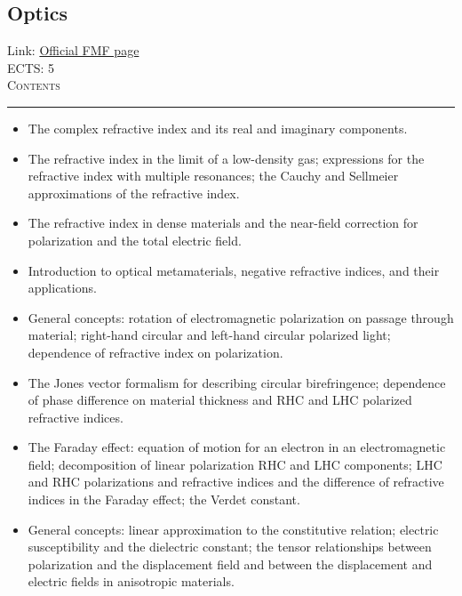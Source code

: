\documentclass[11pt, a4paper]{article}
\newenvironment{course}[3]{
\subsection{#1}%
Link: \href{#2}{Official FMF page}\\%
ECTS: #3%
\vspace{1ex}
\\
{\large \textsc{Contents}}\\[-0.9ex]%
\rule{\textwidth}{0.5pt}
\vspace{-3ex}
}
{}
\newenvironment{chapter}[1]{
\begin{tcolorbox}[title=#1, breakable]
}
{\end{tcolorbox}}
\begin{document}
\begin{course}{Optics}{https://www.fmf.uni-lj.si/en/study-physics/programmes/1fiz/2020/7000777/courses/1165/}{5}
\begin{chapter}{The refractive index}
\begin{itemize}
            \item The complex refractive index and its real and imaginary components.

            \item The refractive index in the limit of a low-density gas; expressions for the refractive index with multiple resonances; the Cauchy and Sellmeier approximations of the refractive index.

            \item The refractive index in dense materials and the near-field correction for polarization and the total electric field.

            \item Introduction to optical metamaterials, negative refractive indices, and their applications.
        
        \end{itemize}
    \end{chapter}

    \begin{chapter}{Optical activity}
        \begin{itemize}
        
            \item General concepts: rotation of electromagnetic polarization on passage through material; right-hand circular and left-hand circular polarized light; dependence of refractive index on polarization.

            \item The Jones vector formalism for describing circular birefringence; dependence of phase difference on material thickness and RHC and LHC polarized refractive indices.

            \item The Faraday effect: equation of motion for an electron in an electromagnetic field; decomposition of linear polarization RHC and LHC components; LHC and RHC polarizations and refractive indices and the difference of refractive indices in the Faraday effect; the Verdet constant.

        \end{itemize}
    \end{chapter}

    \begin{chapter}{Optically anisotropic materials}
        \begin{itemize}
        
            \item General concepts: linear approximation to the constitutive relation; electric susceptibility and the dielectric constant; the tensor relationships between polarization and the displacement field and between the displacement and electric fields in anisotropic materials.


\end{itemize}
\end{chapter}
\end{course}
\end{document}
